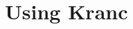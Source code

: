 \documentclass{report}
\begin{document}









\chapter{Using Kranc}
\label{chp:usingkranc}


\end{document}
